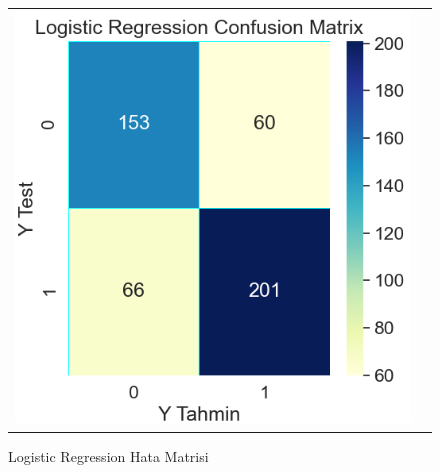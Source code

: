 \documentclass[conference]{IEEEtran}
\begin{document}
\begin{figure}[!h]
	\centering
	\begin{center}
		\begin{tabular}{cc}
			\includegraphics[scale=0.4]{pictures/pic_12.png}&
		\end{tabular}
	\end{center}
	\caption{Logistic Regression Hata Matrisi}
	\label{fig:12}
\end{figure}
\end{document}
